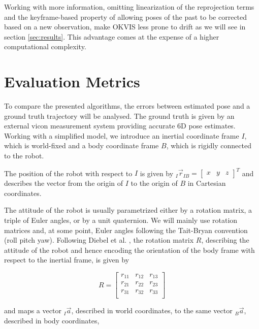 Working with more information, omitting linearization of the reprojection terms and the keyframe-based property of allowing poses of the past to be corrected based on a new observation, make OKVIS less prone to drift as we will see in section \ref{sec:results}. This advantage comes at the expense of a higher computational complexity.



\section{Evaluation Metrics}
\label{sec:metrics}

To compare the presented algorithms, the errors between estimated pose and a ground truth trajectory will be analysed. The ground truth is given by an external vicon measurement system providing accurate 6D pose estimates. Working with a simplified model, we introduce an inertial coordinate frame $I$, which is world-fixed and a body coordinate frame $B$, which is rigidly connected to the robot. 

The position of the robot with respect to $I$ is given by $_I \vec{r}_{IB} = \left[ \begin{array}{ccc} x& y& z \end{array} \right]^T$ and describes the vector from the origin of $I$ to the origin of $B$ in Cartesian coordinates. 

The attitude of the robot is usually parametrized either by a rotation matrix, a triple of Euler angles, or by a unit quaternion. We will mainly use rotation matrices and, at some point, Euler angles following the Tait-Bryan convention (roll pitch yaw). Following Diebel et al. \cite{diebel2006representing}, the rotation matrix $R$, describing the attitude of the robot and hence encoding the orientation of the body frame with respect to the inertial frame, is given by 

\begin{equation}
       R = \left[ \begin{array}{ccc}
		r_{11} & r_{12}	& r_{13} \\
		r_{21} & r_{22} 	& r_{23} \\
		r_{31} & r_{32}	& r_{33} \\
		\end{array} \right]
\end{equation}

and maps a vector $_I \vec{a} $, described in world coordinates, to the same vector $_B \vec{a} $, described in body coordinates,

